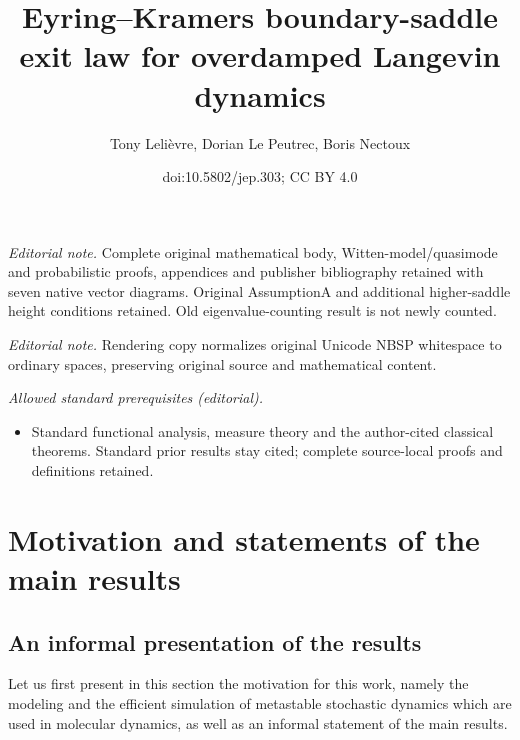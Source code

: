 \documentclass[10pt]{amsart}
\title{Eyring–Kramers boundary-saddle exit law for overdamped Langevin dynamics}
\author{Tony Lelièvre, Dorian Le Peutrec, Boris Nectoux}
\date{doi:10.5802/jep.303; CC BY 4.0}
\theoremstyle{plain}
\theoremstyle{definition}
\begin{document}
\maketitle
\noindent\textit{Editorial note.} Complete original mathematical body, Witten-model/quasimode and probabilistic proofs, appendices and publisher bibliography retained with seven native vector diagrams. Original AssumptionA and additional higher-saddle height conditions retained. Old eigenvalue-counting result is not newly counted.\par\medskip
\noindent\textit{Editorial note.} Rendering copy normalizes original Unicode NBSP whitespace to ordinary spaces, preserving original source and mathematical content.\par\medskip
\noindent\textit{Allowed standard prerequisites (editorial).}\begin{itemize}
\item Standard functional analysis, measure theory and the author-cited classical theorems. Standard prior results stay cited; complete source-local proofs and definitions retained.
\end{itemize}\medskip
\vspace*{-\baselineskip}
\tableofcontents


\section{Motivation and statements of the main results}\label{sec:intro}

\subsection{An informal presentation of the results}\label{sec:informal}

Let us first present in this section the motivation for this work,
namely the modeling and the efficient simulation of metastable
stochastic dynamics which are used in molecular dynamics, as well as
an informal statement of the main results.
\end{document}
